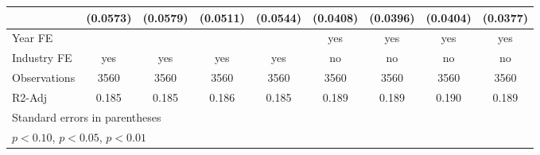 \begin{table}[htbp]
\begin{tabular}{l*{8}{c}}
                    &    (0.0573)         &    (0.0579)         &    (0.0511)         &    (0.0544)         &    (0.0408)         &    (0.0396)         &    (0.0404)         &    (0.0377)         \\
\hline
Year FE             &                     &                     &                     &                     &         yes         &         yes         &         yes         &         yes         \\
Industry FE         &         yes         &         yes         &         yes         &         yes         &          no         &          no         &          no         &          no         \\
Observations        &        3560         &        3560         &        3560         &        3560         &        3560         &        3560         &        3560         &        3560         \\
R2-Adj              &       0.185         &       0.185         &       0.186         &       0.185         &       0.189         &       0.189         &       0.190         &       0.189         \\
\hline\hline
\multicolumn{9}{l}{\footnotesize Standard errors in parentheses}\\
\multicolumn{9}{l}{\footnotesize \sym{*} \(p<0.10\), \sym{**} \(p<0.05\), \sym{***} \(p<0.01\)}\\
\end{tabular}
\end{table}
